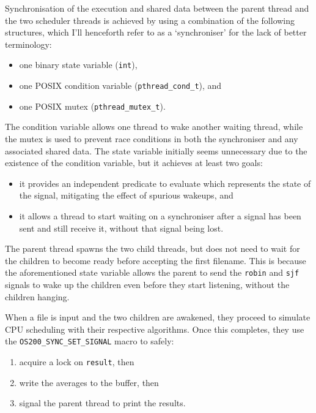 \documentclass[a4paper,12pt,titlepage]{article}
\begin{document}
Synchronisation of the execution and shared data between the parent thread and
the two scheduler threads is achieved by using a combination of the following
structures, which I'll henceforth refer to as a `synchroniser' for the lack of
better terminology:

\begin{itemize}
	\item one binary state variable (\texttt{int}),
	\item one POSIX condition variable (\texttt{pthread\_cond\_t}), and
	\item one POSIX mutex (\texttt{pthread\_mutex\_t}).
\end{itemize}

The condition variable allows one thread to wake another waiting thread, while
the mutex is used to prevent race conditions in both the synchroniser and any
associated shared data. The state variable initially seems unnecessary due to
the existence of the condition variable, but it achieves at least two goals:

\begin{itemize}
	\item it provides an independent predicate to evaluate which represents
	      the state of the signal, mitigating the effect of spurious
	      wakeups, and
	\item it allows a thread to start waiting on a synchroniser after a
	      signal has been sent and still receive it, without that signal
	      being lost.
\end{itemize}

The parent thread spawns the two child threads, but does not need to wait for
the children to become ready before accepting the first filename. This is
because the aforementioned state variable allows the parent to send the
\texttt{robin} and \texttt{sjf} signals to wake up the children even before
they start listening, without the children hanging.

When a file is input and the two children are awakened, they proceed to
simulate CPU scheduling with their respective algorithms. Once this completes,
they use the \texttt{OS200\_SYNC\_SET\_SIGNAL} macro to safely:

\begin{enumerate}
	\item acquire a lock on \texttt{result}, then
	\item write the averages to the buffer, then
	\item signal the parent thread to print the results.
\end{enumerate}
\end{document}
